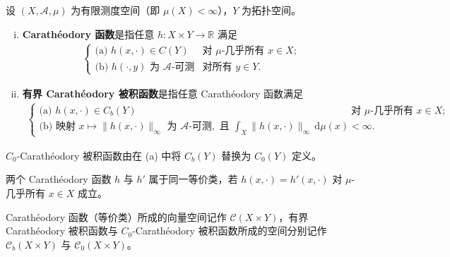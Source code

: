 \documentclass[../../main.tex]{subfiles}%
\begin{document}
\begin{definition}\label{definition:ch05-Caratheodory}
设 $(X,\mathcal{A},\mu)$ 为有限测度空间（即 $\mu(X)<\infty$），$Y$ 为拓扑空间。
\begin{enumerate}[(i)]
\item\label{item:ch05-car-i} \textbf{Carathéodory 函数}是指任意 $h:X\times Y\to\mathbb{R}$ 满足
\begin{align*}
\begin{cases}
\text{(a) } h(x,\cdot)\in C(Y) & \text{对 }\mu\text{-几乎所有 }x\in X;\\
\text{(b) } h(\cdot,y)\text{ 为 }\mathcal{A}\text{-可测} & \text{对所有 }y\in Y.
\end{cases}
\end{align*}
\item\label{item:ch05-car-ii} \textbf{有界 Carathéodory 被积函数}是指任意 Carathéodory 函数满足
\begin{align*}
\begin{cases}
\text{(a) } h(x,\cdot)\in C_b(Y) & \text{对 }\mu\text{-几乎所有 }x\in X;\\
\text{(b) 映射 }x\mapsto\|h(x,\cdot)\|_\infty\text{ 为 }\mathcal{A}\text{-可测},
\text{ 且 }\int_X\|h(x,\cdot)\|_\infty\,\mathrm{d}\mu(x)<\infty.
\end{cases}
\end{align*}
\end{enumerate}
$C_0$-Carathéodory 被积函数由在 (a) 中将 $C_b(Y)$ 替换为 $C_0(Y)$ 定义。

两个 Carathéodory 函数 $h$ 与 $h'$ 属于同一等价类，若 $h(x,\cdot)=h'(x,\cdot)$ 对 $\mu$-几乎所有 $x\in X$ 成立。
\end{definition}

Carathéodory 函数（等价类）所成的向量空间记作 $\mathcal{C}(X\times Y)$，有界 Carathéodory 被积函数与 $C_0$-Carathéodory 被积函数所成的空间分别记作 $\mathcal{C}_b(X\times Y)$ 与 $\mathcal{C}_0(X\times Y)$。
\end{document}
